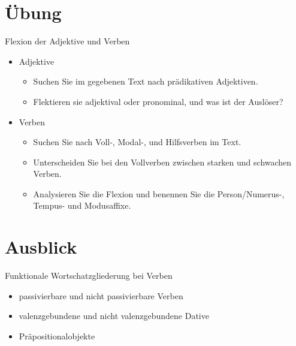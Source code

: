 \section{Übung}

\begin{frame}
  {Flexion der Adjektive und Verben}
  \onslide<+->
  \begin{itemize}[<+->]
    \item Adjektive
      \begin{itemize}[<+->]
        \item Suchen Sie im gegebenen Text nach prädikativen Adjektiven.
        \item Flektieren sie adjektival oder pronominal, und was ist der Auslöser?
      \end{itemize}
      \Zeile
    \item Verben
      \begin{itemize}[<+->]
        \item Suchen Sie nach Voll-, Modal-, und Hilfsverben im Text.
        \item Unterscheiden Sie bei den Vollverben zwischen starken und schwachen Verben.
        \item Analysieren Sie die Flexion und benennen Sie die Person\slash Numerus-, Tempus- und Modusaffixe. 
      \end{itemize}
  \end{itemize}
\end{frame}

\section{Ausblick}

\begin{frame}
  {Funktionale Wortschatzgliederung bei Verben}
  \onslide<+->
  \begin{itemize}[<+->]
    \item passivierbare und nicht passivierbare Verben
    \item valenzgebundene und nicht valenzgebundene Dative
    \item Präpositionalobjekte
  \end{itemize}
\end{frame}

